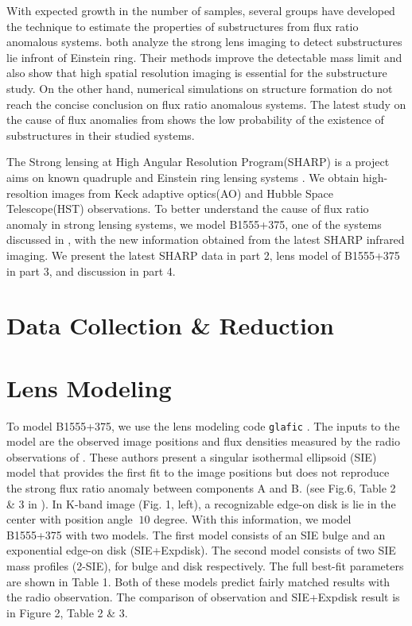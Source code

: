 \documentclass[manuscript]{emulateapj}
\begin{document}
	With expected growth in the number of samples, several groups have developed the technique to estimate the properties of substructures from flux ratio anomalous systems. \citet{V09, H13} both analyze the strong lens imaging to detect substructures lie infront of Einstein ring. Their methods improve the detectable mass limit and also show that high spatial resolution imaging is essential for the substructure study. On the other hand, numerical simulations on structure formation do not reach the concise conclusion on flux ratio anomalous systems. The latest study on the cause of flux anomalies from \citet{Xu14} shows the low probability of the existence of substructures in their studied systems. 
	
	The Strong lensing at High Angular Resolution Program(SHARP) is a project aims on known quadruple and Einstein ring lensing systems \citep{SHARP12}. We obtain high-resoltion images from Keck adaptive optics(AO) and Hubble Space Telescope(HST) observations. To better understand the cause of flux ratio anomaly in strong lensing systems, we model B1555+375, one of the systems discussed in \citet{Xu14}, with the new information obtained from the latest SHARP infrared imaging. We present the latest SHARP data in part 2, lens model of B1555+375 in part 3, and discussion in part 4. 

\section{Data Collection \& Reduction}

\section{Lens Modeling}
To model B1555+375, we use the lens modeling code {\tt glafic}
\citep{Oguri}.  The inputs to the model are the observed image positions
and flux densities measured by the radio observations of \citet{Marlow}.
These authors present a singular isothermal ellipsoid (SIE) model that
provides the first fit to the image positions but
does not reproduce the strong flux ratio anomaly between components A and B.
(see Fig.6, Table 2 \& 3 in \citet{Marlow}). In K-band
image (Fig. 1, left), a recognizable edge-on disk is lie in the center
with position angle $~10$ degree. With this information, we model
B1555+375 with two models. The first model consists of an SIE bulge
and an exponential edge-on disk (SIE+Expdisk). The second model
consists of two SIE mass profiles (2-SIE), for bulge and disk
respectively. The full best-fit parameters are shown in Table 1. Both
of these models predict fairly matched results with the radio
observation. The comparison of observation and SIE+Expdisk result is
in Figure 2, Table 2 \& 3.
\end{document}
